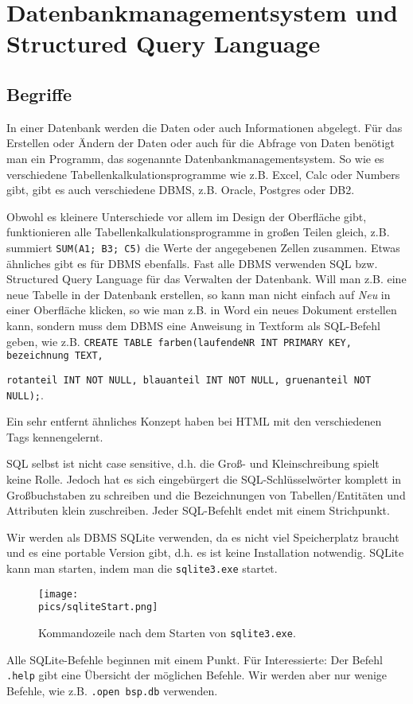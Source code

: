 \section[DBMS und SQL]{Datenbankmanagementsystem und Structured Query Language}
\subsection{Begriffe}
In einer Datenbank werden die Daten oder auch Informationen abgelegt. Für das Erstellen oder Ändern der Daten oder auch für die Abfrage von Daten benötigt man ein Programm, das sogenannte Datenbankmanagementsystem. So wie es verschiedene Tabellenkalkulationsprogramme wie z.B. Excel, Calc oder Numbers gibt, gibt es auch verschiedene DBMS, z.B. Oracle, Postgres oder DB2.

Obwohl es kleinere Unterschiede vor allem im Design der Oberfläche gibt, funktionieren alle Tabellenkalkulationsprogramme in großen Teilen gleich, z.B. summiert \lstinline!SUM(A1; B3; C5)! die Werte der angegebenen Zellen zusammen. Etwas ähnliches gibt es für DBMS ebenfalls. Fast alle DBMS verwenden SQL bzw. Structured Query Language für das Verwalten der Datenbank. Will man z.B. eine neue Tabelle in der Datenbank erstellen, so kann man nicht einfach auf \textit{Neu} in einer Oberfläche klicken, so wie man z.B. in Word ein neues Dokument erstellen kann, sondern muss dem DBMS eine Anweisung in Textform als SQL-Befehl geben, wie z.B.
 \lstinline!CREATE TABLE farben(laufendeNR INT PRIMARY KEY, bezeichnung TEXT,!

\lstinline!rotanteil INT NOT NULL, blauanteil INT NOT NULL, gruenanteil NOT NULL);!.

Ein sehr entfernt ähnliches Konzept haben bei HTML mit den verschiedenen Tags kennengelernt.

SQL selbst ist nicht case sensitive, d.h. die Groß- und Kleinschreibung spielt keine Rolle. Jedoch hat es sich eingebürgert die SQL-Schlüsselwörter komplett in Großbuchstaben zu schreiben und die Bezeichnungen von Tabellen/Entitäten und Attributen klein zuschreiben. Jeder SQL-Befehlt endet mit einem Strichpunkt.

Wir werden als DBMS SQLite verwenden, da es nicht viel Speicherplatz braucht und es eine portable Version gibt, d.h. es ist keine Installation notwendig. SQLite kann man starten, indem man die \texttt{sqlite3.exe} startet.

\begin{figure}[h]
	\centering
	\texttt{[image: \\pics/sqliteStart.png]}
	\caption*{Kommandozeile nach dem Starten von \texttt{sqlite3.exe}.}
\end{figure}
Alle SQLite-Befehle beginnen mit einem Punkt. Für Interessierte: Der Befehl \lstinline!.help! gibt eine Übersicht der möglichen Befehle. Wir werden aber nur wenige Befehle, wie z.B. \lstinline!.open bsp.db! verwenden.